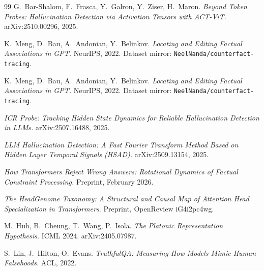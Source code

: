 \documentclass[11pt]{article}
\begin{document}
\begin{thebibliography}{99}
 G.~Bar-Shalom, F.~Frasca, Y.~Galron, Y.~Ziser,
H.~Maron. \emph{Beyond Token Probes: Hallucination Detection via Activation
Tensors with ACT-ViT.} arXiv:2510.00296, 2025.

 K.~Meng, D.~Bau, A.~Andonian, Y.~Belinkov.
\emph{Locating and Editing Factual Associations in GPT.}
NeurIPS, 2022. Dataset mirror: \texttt{NeelNanda/counterfact-tracing}.

 K.~Meng, D.~Bau, A.~Andonian, Y.~Belinkov.
\emph{Locating and Editing Factual Associations in GPT.}
NeurIPS, 2022. Dataset mirror: \texttt{NeelNanda/counterfact-tracing}.

 \emph{ICR Probe: Tracking Hidden State Dynamics for
Reliable Hallucination Detection in LLMs.} arXiv:2507.16488, 2025.

 \emph{LLM Hallucination Detection: A Fast Fourier
Transform Method Based on Hidden Layer Temporal Signals (HSAD).}
arXiv:2509.13154, 2025.

 \emph{How Transformers Reject Wrong Answers:
Rotational Dynamics of Factual Constraint Processing.}
Preprint, February 2026.

 \emph{The HeadGenome Taxonomy: A Structural and Causal
Map of Attention Head Specialization in Transformers.}
Preprint, OpenReview iG4i2pc4wg.

 M.~Huh, B.~Cheung, T.~Wang, P.~Isola.
\emph{The Platonic Representation Hypothesis.}
ICML 2024. arXiv:2405.07987.

 S.~Lin, J.~Hilton, O.~Evans.
\emph{TruthfulQA: Measuring How Models Mimic Human Falsehoods.} ACL, 2022.

\end{thebibliography}
\end{document}
